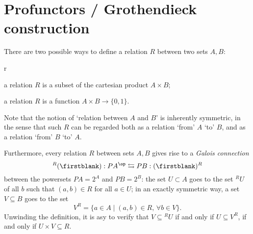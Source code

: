 \section{Profunctors / Grothendieck construction}
\label{sec:org7dd09e1}
There are two possible ways to define a relation $R$ between two sets $A,B$:
\begin{enumtag}{r}
	\item \label{r_1} a relation $R$ is a subset of the cartesian product $A\times B$;
	\item \label{r_2} a relation $R$ is a function $A\times B \to \{0,1\}$.
\end{enumtag}
Note that the notion of `relation between $A$ and $B$' is inherently symmetric, in the sense that such $R$ can be regarded both as a relation `from' $A$ `to' $B$, and as a relation `from' $B$ `to' $A$.

Furthermore, every relation $R$ between sets $A,B$ gives rise to a \emph{Galois connection}
\[{}^R(\firstblank) :PA^\op \leftrightarrows PB : (\firstblank)^R \label{adjunzia} \]
between the powersets $PA=2^A$ and $PB = 2^B$: the set $U\subset A$ goes to the set ${}^RU$ of all $b$ such that $(a,b)\in R$ for all $a\in U$; in an exactly symmetric way, a set $V\subseteq B$ goes to the set
\[V^R = \{a\in A\mid (a,b) \in R,\, \forall b\in V\}.\]
Unwinding the definition, it is asy to verify that $V\subseteq{}^RU$ if and only if $U\subseteq V^R$, if and only if $U\times V\subseteq R$.

